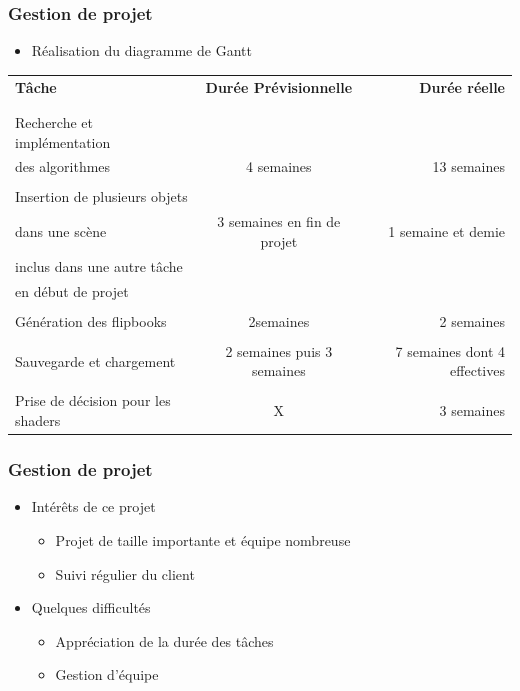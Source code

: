 \documentclass{beamer}
\begin{document}
\begin{frame}
\frametitle{Gestion de projet}
\begin{itemize}[label=$\bullet$]
\item Réalisation du diagramme de Gantt
\end{itemize}
{\fontsize{7}{8}\selectfont
{}
\begin{tabular}{lcr}

\textbf{Tâche} & \textbf{Durée Prévisionnelle} & \textbf{Durée réelle} \\
\\
\hline
\\
Recherche et implémentation \\des algorithmes &
4 semaines & 13 semaines \\
\hline
\\
Insertion de plusieurs objets \\ dans une scène &
3 semaines en fin de projet & 
1 semaine et demie \\ inclus dans 
une autre tâche \\ en début de projet \\
\hline
\\
Génération des flipbooks & 2semaines & 2 semaines \\
\hline
\\
Sauvegarde et chargement & 2 semaines puis 3 semaines &
7 semaines dont 4 effectives \\
\hline
\\
Prise de décision pour les shaders & X & 3 semaines\\

\end{tabular}
}

\end{frame}


\begin{frame}
\frametitle{Gestion de projet}
\begin{itemize}[label=$\bullet$]
\item Intérêts de ce projet
	\begin{itemize}[label=$\circ$]
	\item Projet de taille importante et équipe nombreuse
	\item Suivi régulier du client
	\end{itemize}
\item Quelques difficultés
	\begin{itemize}[label=$\circ$]
	\item Appréciation de la durée des tâches
	\item Gestion d'équipe
	\end{itemize}
\end{itemize}

\end{frame}
\end{document}
